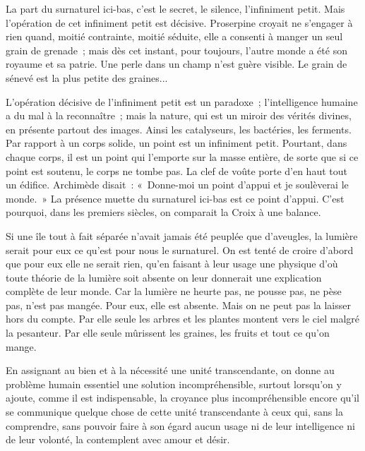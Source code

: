 \documentclass[french,twoside]{book} %
\begin{document}
La part du surnaturel ici-bas, c'est le secret, le silence, l'infiniment petit. Mais l'opération de cet infiniment petit est décisive. Proserpine croyait ne s'engager à rien quand, moitié contrainte, moitié séduite, elle a consenti à manger un seul grain de grenade ; mais dès cet instant, pour toujours, l'autre monde a été son royaume et sa patrie. Une perle dans un champ n'est guère visible. Le grain de sénevé est la plus petite des graines...\par
L'opération décisive de l'infiniment petit est un paradoxe ; l'intelligence humaine a du mal à la reconnaître ; mais la nature, qui est un miroir des vérités divines, en présente partout des images. Ainsi les catalyseurs, les bactéries, les ferments. Par rapport à un corps solide, un point est un infiniment petit. Pourtant, dans chaque corps, il est un point qui l'emporte sur la masse entière, de sorte que si ce point est soutenu, le corps ne tombe pas. La clef de voûte porte d'en haut tout un édifice. Archimède disait : « Donne-moi un point d'appui et je soulèverai le monde. » La présence muette du surnaturel ici-bas est ce point d'appui. C'est pourquoi, dans les premiers siècles, on comparait la Croix à une balance.\par
Si une île tout à fait séparée n'avait jamais été peuplée que d'aveugles, la lumière serait pour eux ce qu'est pour nous le surnaturel. On est tenté de croire d'abord que pour eux elle ne serait rien, qu'en faisant à leur usage une physique d'où toute théorie de la lumière soit absente on leur donnerait une explication complète de leur monde. Car la lumière ne heurte pas, ne pousse pas, ne pèse pas, n'est pas mangée. Pour eux, elle est absente. Mais on ne peut pas la laisser hors du compte. Par elle seule les arbres et les plantes montent vers le ciel malgré la pesanteur. Par elle seule mûrissent les graines, les fruits et tout ce qu'on mange.\par
En assignant au bien et à la nécessité une unité transcendante, on donne au problème humain essentiel une solution incompréhensible, surtout lorsqu'on y ajoute, comme il est indispensable, la croyance plus incompréhensible encore qu'il se communique quelque chose de cette unité transcendante à ceux qui, sans la comprendre, sans pouvoir faire à son égard aucun usage ni de leur intelligence ni de leur volonté, la contemplent avec amour et désir.\par
\end{document}
